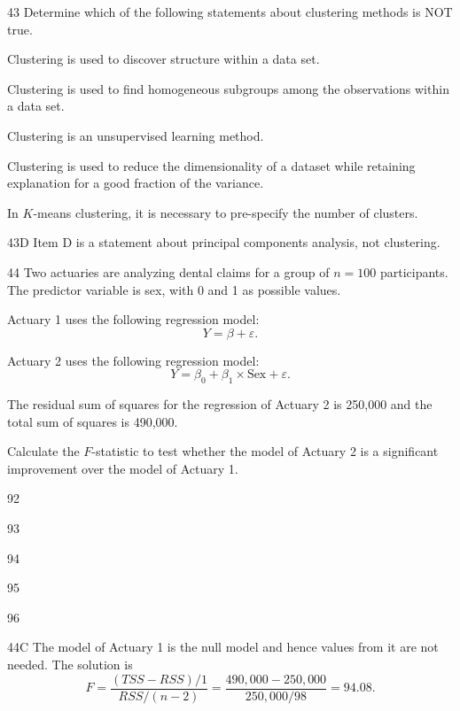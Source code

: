 \begin{question}{43}
Determine which of the following statements about clustering methods is NOT true.

\begin{choices}
\item Clustering is used to discover structure within a data set.
\item Clustering is used to find homogeneous subgroups among the observations within a data set.
\item Clustering is an unsupervised learning method.
\item Clustering is used to reduce the dimensionality of a dataset while retaining explanation for a good fraction of the variance.
\item In $K$-means clustering, it is necessary to pre-specify the number of clusters.
\end{choices}
\end{question}
\begin{solution}{43}{D}
Item D is a statement about principal components analysis, not clustering.
\end{solution}

\begin{question}{44}
Two actuaries are analyzing dental claims for a group of $n = 100$ participants. The predictor variable is sex, with 0 and 1 as possible values.

Actuary 1 uses the following regression model:
\[ Y = \beta + \varepsilon. \]

Actuary 2 uses the following regression model:
\[ Y = \beta_0 + \beta_1 \times \text{Sex} + \varepsilon. \]

The residual sum of squares for the regression of Actuary 2 is 250,000 and the total sum of squares is 490,000.

Calculate the $F$-statistic to test whether the model of Actuary 2 is a significant improvement over the model of Actuary 1.

\begin{choices}
\item 92
\item 93
\item 94
\item 95
\item 96
\end{choices}
\end{question}
\begin{solution}{44}{C}
The model of Actuary 1 is the null model and hence values from it are not needed. The solution is
\[ F = \frac{(TSS - RSS)/1}{RSS/(n-2)} = \frac{490{,}000 - 250{,}000}{250{,}000/98} = 94.08. \]
\end{solution}


